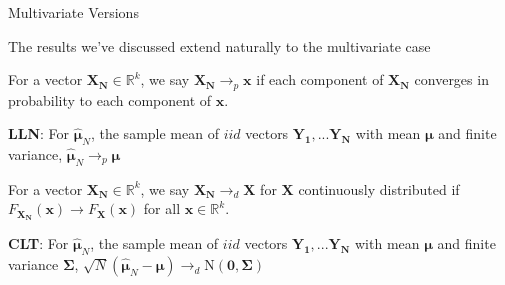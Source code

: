 \documentclass[11pt,english,handout]{beamer}
\newenvironment{wideitemize}{\itemize\addtolength{\itemsep}{10pt}}{\enditemize}
\begin{document}
\begin{frame}{Multivariate Versions}

\begin{wideitemize}
	\item 
	The results we've discussed extend naturally to the multivariate case
	
	\pause
	\item
	For a vector $\mathbf{X_N} \in \mathbb{R}^k$, we say $\mathbf{X_N} \rightarrow_p \mathbf{x}$ if each component of $\mathbf{X_N}$ converges in probability to each component of $\mathbf{x}$.
	
	\pause
	\item
	\textbf{LLN}: For $\hat{\boldsymbol{\mu}}_N$, the sample mean of $iid$ vectors $\mathbf{Y_1},...\mathbf{Y_N}$ with mean $\boldsymbol{\mu}$ and finite variance, $\hat{\boldsymbol{\mu}}_N \rightarrow_p \boldsymbol{\mu}$
	
	\pause
	\item
	For a vector $\mathbf{X_N} \in \mathbb{R}^k$, we say $\mathbf{X_N} \rightarrow_d \mathbf{X}$ for $\mathbf{X}$ continuously distributed if $F_{\mathbf{X_N}}(\mathbf{x}) \rightarrow F_{\mathbf{X}}(\mathbf{x})$ for all $\mathbf{x} \in \mathbb{R}^k$. 
	
	\item
	\textbf{CLT}: For $\hat{\boldsymbol{\mu}}_N$, the sample mean of $iid$ vectors $\mathbf{Y_1},...\mathbf{Y_N}$ with mean $\boldsymbol{\mu}$ and finite variance $\boldsymbol{\Sigma}$, $\sqrt{N} (\hat{\boldsymbol{\mu}}_N -\boldsymbol{\mu}) \rightarrow_d \mathrm{N}(\mathbf{0},\boldsymbol{\Sigma})$
	
	
\end{wideitemize}
	
\end{frame}
\end{document}
